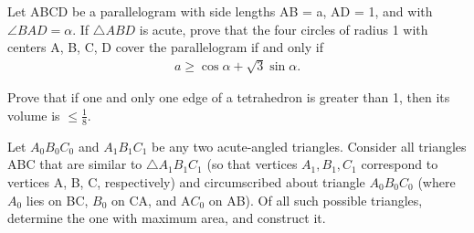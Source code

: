 \item Let ABCD be a parallelogram with side lengths AB = a, AD = 1, and with $\angle{BAD} =\alpha$. If $\triangle{ABD}$ is acute, prove that the four circles of radius 1 with centers A, B, C, D cover the parallelogram if and only if
\begin{align*}
a \geq\cos{\alpha} + \sqrt{3} \sin{\alpha}.
\end{align*}
\item Prove that if one and only one edge of a tetrahedron is greater than 1, then its volume is $\leq \frac{1}{8}.$
\item Let $A_0B_0C_0$ and $A_1B_1C_1$ be any two acute-angled triangles. Consider all triangles ABC that are similar to $\triangle{A_1B_1C_1}$ (so that vertices $A_1, B_1, C_1$ correspond to vertices A, B, C, respectively) and circumscribed about triangle $A_0B_0C_0$ (where $A_0$ lies on BC, $B_0$ on CA, and A$C_0$ on AB). Of all such possible triangles, determine the one with maximum area, and construct it.


